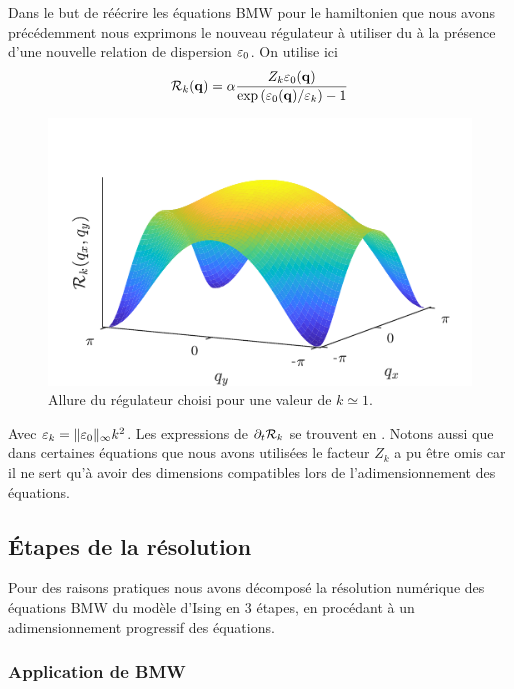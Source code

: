 \documentclass[10pt]{article}
\begin{document}
\begin{multicols}{2}
Dans le but de réécrire les équations BMW pour le hamiltonien que nous avons précédemment nous exprimons le nouveau régulateur à utiliser du à la présence d'une nouvelle relation de dispersion $\varepsilon_0$. On utilise ici
\begin{equation}
	\mathcal{R}_k({\bf q}) = \alpha \frac{Z_k \varepsilon_0({\bf q})}{\exp{(\varepsilon_0({\bf q})/\varepsilon_k)} -1}
\end{equation}
\vspace*{-22pt}
\begin{figure}[H]
\begin{center}
	\includegraphics[width=0.95\columnwidth]{RegIsing.pdf}
\end{center}
\caption{Allure du régulateur choisi pour une valeur de $k\simeq 1$.}
\end{figure}
Avec $\varepsilon_k = \| \varepsilon_0 \|_\infty k^2$. Les expressions de $\partial_t \mathcal{R}_k$ se trouvent en . Notons aussi que dans certaines équations que nous avons utilisées le facteur $Z_k$ a pu être omis car il ne sert qu'à avoir des dimensions compatibles lors de l'adimensionnement des équations. 




\vspace*{11pt}

\subsection{Étapes de la résolution}

Pour des raisons pratiques nous avons décomposé la résolution numérique des équations BMW du modèle d'Ising en 3 étapes, en procédant à un adimensionnement progressif des équations. 


\subsubsection{Application de BMW}


\end{multicols}
\end{document}
